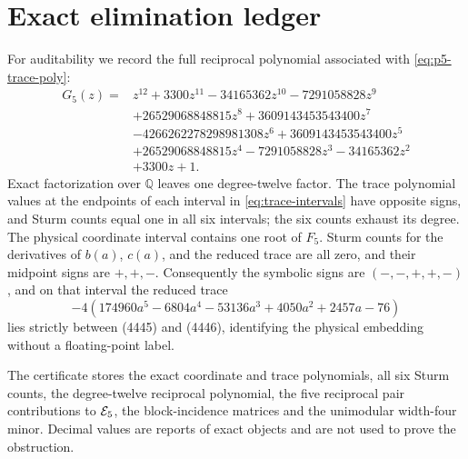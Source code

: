 \appendix
\section{Exact elimination ledger}

For auditability we record the full reciprocal polynomial associated with
\eqref{eq:p5-trace-poly}:
\begin{align*}
G_5(z)={}&z^{12}+3300z^{11}-34165362z^{10}-7291058828z^9\\
&+26529068848815z^8+3609143453543400z^7\\
&-4266262278298981308z^6+3609143453543400z^5\\
&+26529068848815z^4-7291058828z^3-34165362z^2\\
&+3300z+1.
\end{align*}
Exact factorization over \(\mathbb Q\) leaves one degree-twelve factor.
The trace polynomial values at the endpoints of each interval in
\eqref{eq:trace-intervals} have opposite signs, and Sturm counts equal one in
all six intervals; the six counts exhaust its degree.  The physical
coordinate interval contains one root of \(F_5\).  Sturm counts for the
derivatives of \(b(a)\), \(c(a)\), and the reduced trace are all zero, and
their midpoint signs are \(+,+,-\).  Consequently the symbolic signs are
\((-,-,+,+,-)\), and on that interval the
reduced trace
\[
-4(174960a^5-6804a^4-53136a^3+4050a^2+2457a-76)
\]
lies strictly between (4445) and (4446), identifying the physical
embedding without a floating-point label.

The certificate stores the exact coordinate and trace polynomials, all six
Sturm counts, the degree-twelve reciprocal polynomial, the five reciprocal
pair contributions to \(\mathcal E_5\), the block-incidence matrices and the
unimodular width-four minor.  Decimal values are reports of exact objects and
are not used to prove the obstruction.
